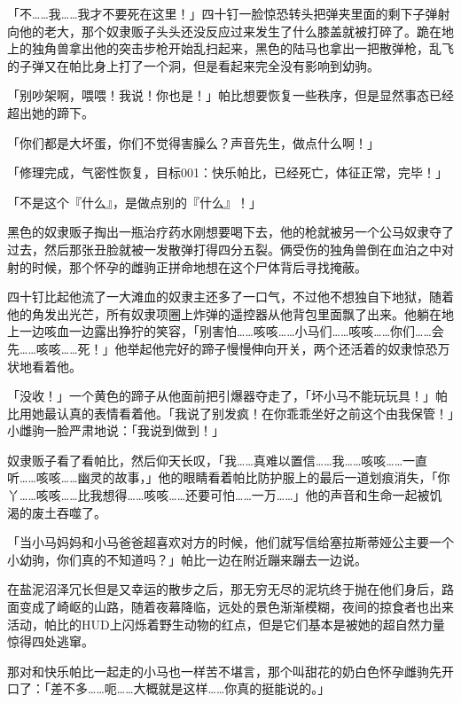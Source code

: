 「不……我……我才不要死在这里！」四十钉一脸惊恐转头把弹夹里面的剩下子弹射向他的老大，那个奴隶贩子头头还没反应过来发生了什么膝盖就被打碎了。跪在地上的独角兽拿出他的突击步枪开始乱扫起来，黑色的陆马也拿出一把散弹枪，乱飞的子弹又在帕比身上打了一个洞，但是看起来完全没有影响到幼驹。

「别吵架啊，喂喂！我说！你也是！」帕比想要恢复一些秩序，但是显然事态已经超出她的蹄下。

「你们都是大坏蛋，你们不觉得害臊么？声音先生，做点什么啊！」

「{\mt 修理完成，气密性恢复，目标001：快乐帕比，已经死亡，体征正常，完毕！}」

「不是这个『什么』，是做点别的『什么』！」

黑色的奴隶贩子掏出一瓶治疗药水刚想要喝下去，他的枪就被另一个公马奴隶夺了过去，然后那张丑脸就被一发散弹打得四分五裂。俩受伤的独角兽倒在血泊之中对射的时候，那个怀孕的雌驹正拼命地想在这个尸体背后寻找掩蔽。

四十钉比起他流了一大滩血的奴隶主还多了一口气，不过他不想独自下地狱，随着他的角发出光芒，所有奴隶项圈上炸弹的遥控器从他背包里面飘了出来。他躺在地上一边咳血一边露出狰狞的笑容，「别害怕……咳咳……小马们……咳咳……你们……会先……咳咳……死！」他举起他完好的蹄子慢慢伸向开关，两个还活着的奴隶惊恐万状地看着他。

「没收！」一个黄色的蹄子从他面前把引爆器夺走了，「坏小马不能玩玩具！」帕比用她最认真的表情看着他。「我说了别发疯！在你乖乖坐好之前这个由我保管！」小雌驹一脸严肃地说：「我说到做到！」

奴隶贩子看了看帕比，然后仰天长叹，「我……真难以置信……我……咳咳……一直听……咳咳……幽灵的故事，」他的眼睛看着帕比防护服上的最后一道划痕消失，「你丫……咳咳……比我想得……咳咳……还要可怕……一万……」他的声音和生命一起被饥渴的废土吞噬了。

\horizonline


「当小马妈妈和小马爸爸超喜欢对方的时候，他们就写信给塞拉斯蒂娅公主要一个小幼驹，你们真的不知道吗？」帕比一边在附近蹦来蹦去一边说。

在盐泥沼泽冗长但是又幸运的散步之后，那无穷无尽的泥坑终于抛在他们身后，路面变成了崎岖的山路，随着夜幕降临，远处的景色渐渐模糊，夜间的掠食者也出来活动，帕比的HUD上闪烁着野生动物的红点，但是它们基本是被她的超自然力量惊得四处逃窜。

那对和快乐帕比一起走的小马也一样苦不堪言，那个叫甜花的奶白色怀孕雌驹先开口了：「差不多……呃……大概就是这样……你真的挺能说的。」

